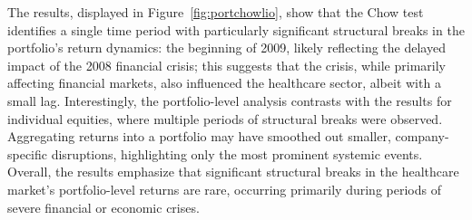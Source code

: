 The results, displayed in Figure~\ref{fig:portchowlio}, show that the Chow test identifies a single time period with
particularly significant structural breaks in the portfolio's return dynamics: the beginning of 2009, likely reflecting the 
delayed impact of the 2008 financial crisis; this suggests that the crisis, while primarily affecting financial markets, 
also influenced the healthcare sector, albeit with a small lag.
Interestingly, the portfolio-level analysis contrasts with the results for individual equities, where multiple periods of 
structural breaks were observed.
Aggregating returns into a portfolio may have smoothed out smaller, company-specific disruptions, highlighting only the
most prominent systemic events.
Overall, the results emphasize that significant structural breaks in the healthcare market's portfolio-level returns are rare,
occurring primarily during periods of severe financial or economic crises.